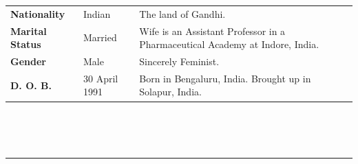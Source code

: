 \documentclass[11pt]{anirudhcv}
\begin{document}
\vspace{-0.9em}\begin{minipage}[t]{\textwidth}
	\vspace{-\baselineskip} %
	\addtolength\tabcolsep{10pt}\renewcommand{\arraystretch}{1.25}
	\begin{tabular}{L{2cm} L{2.5cm} L{10.5cm}}
		\textbf{Nationality} & Indian & The land of Gandhi.\\
		\textbf{Marital Status} & Married & Wife is an Assistant Professor in a Pharmaceutical Academy at Indore, India.\\
		\textbf{Gender} & Male & Sincerely Feminist.\\
		\textbf{D. O. B.} & 30 April 1991 & Born in Bengaluru, India. Brought up in Solapur, India.\\
	\end{tabular}\\
\end{minipage}\\


\noindent\color{black}\rule{0.81\paperwidth}{0.5ex}
\newline
{}\hfill{}

	
\end{document}
